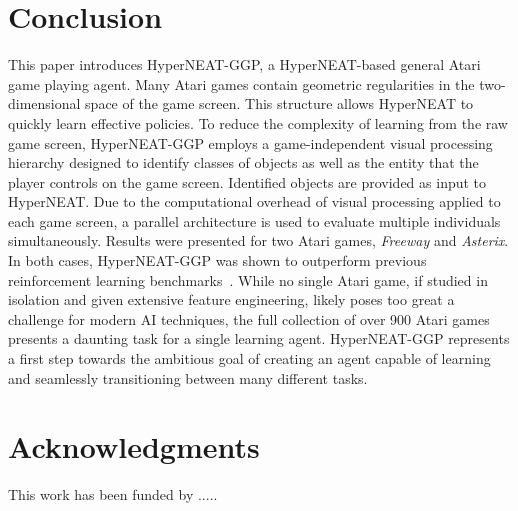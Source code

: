 \documentclass{sig-alternate}
\begin{document}
\section{Conclusion}
\label{sec:conclusion}
This paper introduces HyperNEAT-GGP, a HyperNEAT-based general Atari game playing agent. Many Atari games contain geometric regularities in the two-dimensional space of the game screen. This structure allows HyperNEAT to quickly learn effective policies. To reduce the complexity of learning from the raw game screen, HyperNEAT-GGP employs a game-independent visual processing hierarchy designed to identify classes of objects as well as the entity that the player controls on the game screen. Identified objects are provided as input to HyperNEAT. Due to the computational overhead of visual processing applied to each game screen, a parallel architecture is used to evaluate multiple individuals simultaneously. Results were presented for two Atari games, \textit{Freeway} and \textit{Asterix}. In both cases, HyperNEAT-GGP was shown to outperform previous reinforcement learning benchmarks~\cite{naddaf10}. While no single Atari game, if studied in isolation and given extensive feature engineering, likely poses too great a challenge for modern AI techniques, the full collection of over 900 Atari games presents a daunting task for a single learning agent. HyperNEAT-GGP represents a first step towards the ambitious goal of creating an agent capable of learning and seamlessly transitioning between many different tasks.

\section{Acknowledgments}
This work has been funded by .....


%

\end{document}

